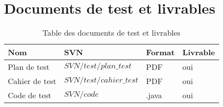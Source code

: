 
\chapter{Documents de test et livrables}

\begin{table}[!h]
\begin{center}	
\begin{tabular}{|p{}|p{4cm}|p{2cm}|p{2cm}|}
\hline
\textbf{Nom} & \textbf{SVN} & \textbf{Format} & \textbf{Livrable} \\
\hline	
Plan de test & $SVN/test/plan\_test$ & PDF & oui \\	
\hline
Cahier de test & $SVN/test/cahier\_test$ & PDF & oui \\
\hline
Code de test & $SVN/code$ & .java & oui\\
\hline
\end{tabular}
\end{center}
\caption{Table des documents de test et livrables}
\end{table}